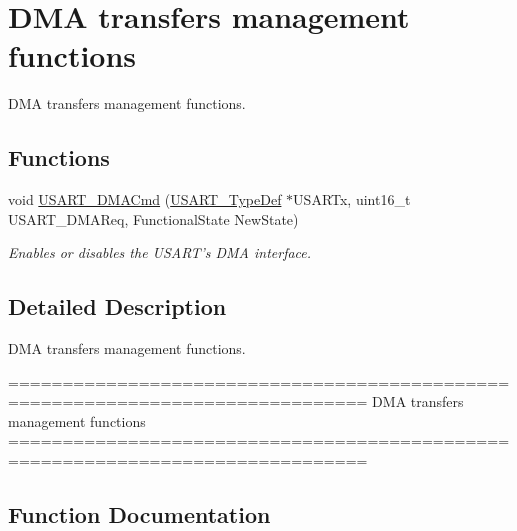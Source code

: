 \hypertarget{group___u_s_a_r_t___group8}{}\section{D\+M\+A transfers management functions}
\label{group___u_s_a_r_t___group8}


D\+M\+A transfers management functions.  


\subsection*{Functions}
\begin{DoxyCompactItemize}
\item 
void \hyperlink{group___u_s_a_r_t___group8_ga902857f199ebfba21c63d725354af66f}{U\+S\+A\+R\+T\+\_\+\+D\+M\+A\+Cmd} (\hyperlink{struct_u_s_a_r_t___type_def}{U\+S\+A\+R\+T\+\_\+\+Type\+Def} $\ast$U\+S\+A\+R\+Tx, uint16\+\_\+t U\+S\+A\+R\+T\+\_\+\+D\+M\+A\+Req, Functional\+State New\+State)
\begin{DoxyCompactList}\small\item\em Enables or disables the U\+S\+A\+R\+T's D\+M\+A interface. \end{DoxyCompactList}\end{DoxyCompactItemize}


\subsection{Detailed Description}
D\+M\+A transfers management functions. 

\begin{DoxyVerb} ===============================================================================
                      DMA transfers management functions
 ===============================================================================  \end{DoxyVerb}
 

\subsection{Function Documentation}
\hypertarget{group___u_s_a_r_t___group8_ga902857f199ebfba21c63d725354af66f}{}
